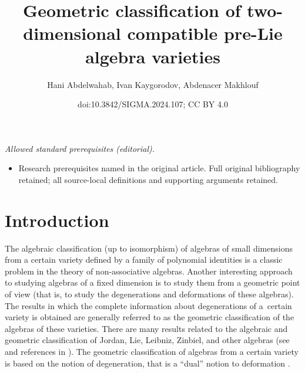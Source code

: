 \documentclass[10pt,a4paper]{amsart}
\title{Geometric classification of two-dimensional compatible pre-Lie algebra varieties}
\author{Hani Abdelwahab, Ivan Kaygorodov, Abdenacer Makhlouf}
\date{doi:10.3842/SIGMA.2024.107; CC BY 4.0}
\numberwithin{equation}{section}
\begin{document}
\maketitle
\noindent\textit{Allowed standard prerequisites (editorial).}\begin{itemize}
\item Research prerequisites named in the original article. Full original bibliography retained; all source-local definitions and supporting arguments retained.
\end{itemize}\medskip
\section{Introduction}

The algebraic classification (up to isomorphism) of algebras of
small dimensions from a certain variety defined by a family of polynomial identities is a %
classic problem in the theory of non-associative algebras.
Another interesting approach to studying algebras of a fixed dimension is to study them from a geometric point of view (that is, to study the degenerations and deformations of these algebras). The results in which the complete information about degenerations of a~certain variety is obtained are generally referred to as the geometric classification of the algebras of these varieties. There are many results related to the algebraic and geometric classification of
Jordan, Lie, Leibniz, Zinbiel, and other algebras
(see \cite{abcf, fkkv, afm, BB09,BB14, EM22, BT22, GRH, KKL, KV, LLL} and references in \cite{k23,MS,l24}). The geometric classification of algebras from a certain variety is based on the notion of degeneration, that is a ``dual'' notion to deformation \cite{b,D23,EM22,HSZ,lsb20,c}.
\end{document}
